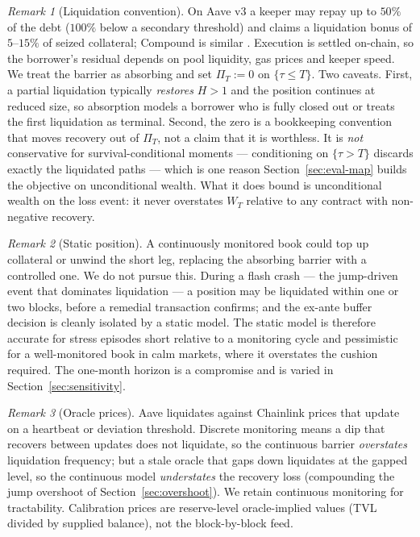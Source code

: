 \documentclass[11pt]{article}
\theoremstyle{plain}
\theoremstyle{definition}
\theoremstyle{remark}
\newtheorem{remark}{Remark}
\begin{document}
\begin{remark}[Liquidation convention]\label{rem:liquidation}
On Aave v3 a keeper may repay up to $50\%$ of the debt ($100\%$ below a secondary threshold) and
claims a liquidation bonus of $5$--$15\%$ of seized collateral; Compound is similar
\citep{Qin2021,HeimbachHuang2024}. Execution is settled on-chain, so the borrower's residual depends
on pool liquidity, gas prices and keeper speed. We treat the barrier as absorbing and set
$\Pi_T:=0$ on $\{\tau\le T\}$. Two caveats. First, a partial liquidation typically \emph{restores}
$H>1$ and the position continues at reduced size, so absorption models a borrower who is fully
closed out or treats the first liquidation as terminal. Second, the zero is a bookkeeping convention
that moves recovery out of $\Pi_T$, not a claim that it is worthless. It is \emph{not} conservative
for survival-conditional moments --- conditioning on $\{\tau>T\}$ discards exactly the liquidated
paths --- which is one reason Section~\ref{sec:eval-map} builds the objective on unconditional
wealth. What it does bound is unconditional wealth on the loss event: it never overstates $W_T$
relative to any contract with non-negative recovery.
\end{remark}

\begin{remark}[Static position]\label{rem:dynamic}
A continuously monitored book could top up collateral or unwind the short leg, replacing the
absorbing barrier with a controlled one. We do not pursue this. During a flash crash --- the
jump-driven event that dominates liquidation --- a position may be liquidated within one or two
blocks, before a remedial transaction confirms; and the ex-ante buffer decision is cleanly isolated
by a static model. The static model is therefore accurate for stress episodes short relative to a
monitoring cycle and pessimistic for a well-monitored book in calm markets, where it overstates the
cushion required. The one-month horizon is a compromise and is varied in
Section~\ref{sec:sensitivity}.
\end{remark}

\begin{remark}[Oracle prices]\label{rem:oracle}
Aave liquidates against Chainlink prices that update on a heartbeat or deviation threshold. Discrete
monitoring means a dip that recovers between updates does not liquidate, so the continuous barrier
\emph{overstates} liquidation frequency; but a stale oracle that gaps down liquidates at the gapped
level, so the continuous model \emph{understates} the recovery loss (compounding the jump overshoot of
Section~\ref{sec:overshoot}). We retain continuous monitoring for tractability. Calibration prices
are reserve-level oracle-implied values (TVL divided by supplied balance), not the block-by-block
feed.
\end{remark}
\end{document}
